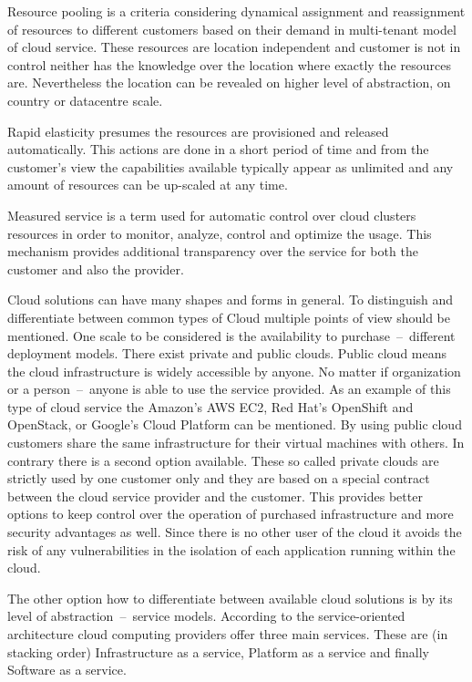 Resource pooling is a criteria considering dynamical assignment and reassignment of resources to different customers based on their demand in multi-tenant model of cloud service. These resources are location independent and customer is not in control neither has the knowledge over the location where exactly the resources are. Nevertheless the location can be revealed on higher level of abstraction, on country or datacentre scale.

Rapid elasticity presumes the resources are provisioned and released automatically. This actions are done in a short period of time and from the customer's view the capabilities available typically appear as unlimited and any amount of resources can be up-scaled at any time.

Measured service is a term used for automatic control over cloud clusters resources in order to monitor, analyze, control and optimize the usage. This mechanism provides additional transparency over the service for both the customer and also the provider.

Cloud solutions can have many shapes and forms in general. To distinguish and differentiate between common types of Cloud multiple points of view should be mentioned. One scale to be considered is the availability to purchase \,--\, different deployment models. There exist private and public clouds. Public cloud means the cloud infrastructure is widely accessible by anyone. No matter if organization or a person \,--\, anyone is able to use the service provided. As an example of this type of cloud service the Amazon's AWS EC2, Red Hat's OpenShift and OpenStack, or Google's Cloud Platform can be mentioned. By using public cloud customers share the same infrastructure for their virtual machines with others. In contrary there is a second option available. These so called private clouds are strictly used by one customer only and they are based on a special contract between the cloud service provider and the customer. This provides better options to keep control over the operation of purchased infrastructure and more security advantages as well. Since there is no other user of the cloud it avoids the risk of any vulnerabilities in the isolation of each application running within the cloud.

The other option how to differentiate between available cloud solutions is by its level of abstraction \,--\, service models. According to the service-oriented architecture cloud computing providers offer three main services. These are (in stacking order) Infrastructure as a service, Platform as a service and finally Software as a service.

